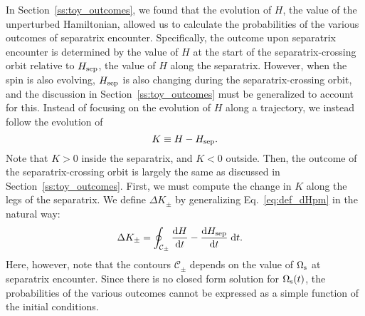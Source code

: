 \documentclass[
        fleqn,
        usenatbib,
        referee,
    ]{mnras}
\newcommand*{\rd}[2]{\frac{\mathrm{d}#1}{\mathrm{d}#2}}
\begin{document}
In Section~\ref{ss:toy_outcomes}, we found that the evolution of $H$, the value
of the unperturbed Hamiltonian, allowed us to calculate the probabilities of the
various outcomes of separatrix encounter. Specifically, the outcome upon
separatrix encounter is determined by the value of $H$ at the start of the
separatrix-crossing orbit relative to $H_{\rm sep}$, the value of $H$ along the
separatrix. However, when the spin is also evolving, $H_{\rm sep}$ is also
changing during the separatrix-crossing orbit, and the discussion in
Section~\ref{ss:toy_outcomes} must be generalized to account for this. Instead
of focusing on the evolution of $H$ along a trajectory, we instead follow the
evolution of
\begin{equation}
    K \equiv H - H_{\rm sep}.
\end{equation}
Note that $K > 0$ inside the separatrix, and $K < 0$ outside. Then, the outcome
of the separatrix-crossing orbit is largely the same as discussed in
Section~\ref{ss:toy_outcomes}. First, we must compute the change in $K$ along
the legs of the separatrix. We define $\Delta K_{\pm}$ by generalizing
Eq.~\eqref{eq:def_dHpm} in the natural way:
\begin{align}
    \Delta K_{\pm} &= \oint_{\mathcal{C}_{\pm}} \rd{H}{t}
        - \rd{H_{\rm sep}}{t}\;\mathrm{d}t.\label{eq:def_dK_weaktide}
\end{align}
Here, however, note that the contours $\mathcal{C}_{\pm}$ depends on the value
of $\Omega_{\rm s}$ at separatrix encounter. Since there is no closed form
solution for $\Omega_{\rm s}(t)$, the probabilities of the various outcomes
cannot be expressed as a simple function of the initial conditions.
\end{document}
